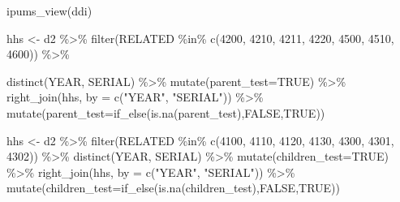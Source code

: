 \documentclass[
]{book}
\newenvironment{Shaded}{\begin{snugshade}}{\end{snugshade}}
\newcommand{\AttributeTok}[1]{\textcolor[rgb]{0.77,0.63,0.00}{#1}}
\newcommand{\ConstantTok}[1]{\textcolor[rgb]{0.00,0.00,0.00}{#1}}
\newcommand{\DecValTok}[1]{\textcolor[rgb]{0.00,0.00,0.81}{#1}}
\newcommand{\FunctionTok}[1]{\textcolor[rgb]{0.00,0.00,0.00}{#1}}
\newcommand{\NormalTok}[1]{#1}
\newcommand{\OtherTok}[1]{\textcolor[rgb]{0.56,0.35,0.01}{#1}}
\newcommand{\SpecialCharTok}[1]{\textcolor[rgb]{0.00,0.00,0.00}{#1}}
\newcommand{\StringTok}[1]{\textcolor[rgb]{0.31,0.60,0.02}{#1}}
\begin{document}
\begin{Shaded}
\begin{Highlighting}[]
\FunctionTok{ipums\_view}\NormalTok{(ddi)}
\end{Highlighting}
\end{Shaded}

\begin{Shaded}
\begin{Highlighting}[]
\NormalTok{  hhs }\OtherTok{\textless{}{-}}\NormalTok{ d2 }\SpecialCharTok{\%\textgreater{}\%} \FunctionTok{filter}\NormalTok{(RELATED }\SpecialCharTok{\%in\%} \FunctionTok{c}\NormalTok{(}\DecValTok{4200}\NormalTok{, }\DecValTok{4210}\NormalTok{, }\DecValTok{4211}\NormalTok{, }\DecValTok{4220}\NormalTok{, }\DecValTok{4500}\NormalTok{, }\DecValTok{4510}\NormalTok{, }\DecValTok{4600}\NormalTok{)) }\SpecialCharTok{\%\textgreater{}\%} 
  
  \FunctionTok{distinct}\NormalTok{(YEAR, SERIAL) }\SpecialCharTok{\%\textgreater{}\%} \FunctionTok{mutate}\NormalTok{(}\AttributeTok{parent\_test=}\ConstantTok{TRUE}\NormalTok{) }\SpecialCharTok{\%\textgreater{}\%} \FunctionTok{right\_join}\NormalTok{(hhs, }\AttributeTok{by =} \FunctionTok{c}\NormalTok{(}\StringTok{"YEAR"}\NormalTok{, }\StringTok{"SERIAL"}\NormalTok{)) }\SpecialCharTok{\%\textgreater{}\%} \FunctionTok{mutate}\NormalTok{(}\AttributeTok{parent\_test=}\FunctionTok{if\_else}\NormalTok{(}\FunctionTok{is.na}\NormalTok{(parent\_test),}\ConstantTok{FALSE}\NormalTok{,}\ConstantTok{TRUE}\NormalTok{))}

\NormalTok{  hhs }\OtherTok{\textless{}{-}}\NormalTok{ d2 }\SpecialCharTok{\%\textgreater{}\%} \FunctionTok{filter}\NormalTok{(RELATED }\SpecialCharTok{\%in\%} \FunctionTok{c}\NormalTok{(}\DecValTok{4100}\NormalTok{, }\DecValTok{4110}\NormalTok{, }\DecValTok{4120}\NormalTok{, }\DecValTok{4130}\NormalTok{, }\DecValTok{4300}\NormalTok{, }\DecValTok{4301}\NormalTok{, }\DecValTok{4302}\NormalTok{)) }\SpecialCharTok{\%\textgreater{}\%} \FunctionTok{distinct}\NormalTok{(YEAR, SERIAL) }\SpecialCharTok{\%\textgreater{}\%} \FunctionTok{mutate}\NormalTok{(}\AttributeTok{children\_test=}\ConstantTok{TRUE}\NormalTok{) }\SpecialCharTok{\%\textgreater{}\%} \FunctionTok{right\_join}\NormalTok{(hhs, }\AttributeTok{by =} \FunctionTok{c}\NormalTok{(}\StringTok{"YEAR"}\NormalTok{, }\StringTok{"SERIAL"}\NormalTok{)) }\SpecialCharTok{\%\textgreater{}\%} \FunctionTok{mutate}\NormalTok{(}\AttributeTok{children\_test=}\FunctionTok{if\_else}\NormalTok{(}\FunctionTok{is.na}\NormalTok{(children\_test),}\ConstantTok{FALSE}\NormalTok{,}\ConstantTok{TRUE}\NormalTok{))}
\end{Highlighting}
\end{Shaded}
\end{document}
